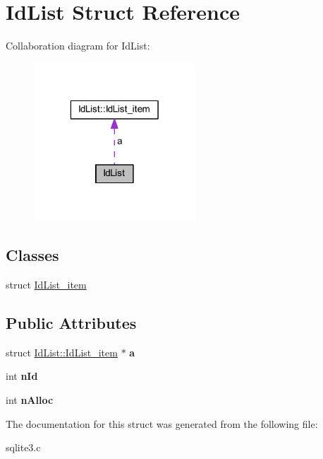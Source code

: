 \hypertarget{struct_id_list}{\section{Id\-List Struct Reference}
\label{struct_id_list}
}


Collaboration diagram for Id\-List\-:\nopagebreak
\begin{figure}[H]
\begin{center}
\leavevmode
\includegraphics[width=172pt]{struct_id_list__coll__graph}
\end{center}
\end{figure}
\subsection*{Classes}
\begin{DoxyCompactItemize}
\item 
struct \hyperlink{struct_id_list_1_1_id_list__item}{Id\-List\-\_\-item}
\end{DoxyCompactItemize}
\subsection*{Public Attributes}
\begin{DoxyCompactItemize}
\item 
\hypertarget{struct_id_list_ad33082fd71286c1159711a1a3e979763}{struct \hyperlink{struct_id_list_1_1_id_list__item}{Id\-List\-::\-Id\-List\-\_\-item} $\ast$ {\bfseries a}}\label{struct_id_list_ad33082fd71286c1159711a1a3e979763}

\item 
\hypertarget{struct_id_list_afb785717796d8b3c72d1ae682dcb6ff0}{int {\bfseries n\-Id}}\label{struct_id_list_afb785717796d8b3c72d1ae682dcb6ff0}

\item 
\hypertarget{struct_id_list_ace055dd6237832b141026ea3463c18ae}{int {\bfseries n\-Alloc}}\label{struct_id_list_ace055dd6237832b141026ea3463c18ae}

\end{DoxyCompactItemize}


The documentation for this struct was generated from the following file\-:\begin{DoxyCompactItemize}
\item 
sqlite3.\-c\end{DoxyCompactItemize}
